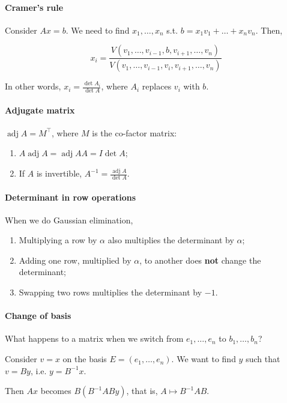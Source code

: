 \documentclass{article}
\begin{document}
\paragraph{Cramer's rule} Consider $Ax=b$. We need to find $x_1,\dots,x_n$ s.t. $b = x_1 v_1 + \dots + x_n v_n$. Then,

$$
x_i = \frac{V(v_1,\dots,v_{i-1}, b, v_{i+1}, \dots, v_n)}{V(v_1,\dots,v_{i-1}, v_i, v_{i+1}, \dots, v_n)}
$$

In other words, $x_i = \frac{\det A_i}{\det A}$, where $A_i$ replaces $v_i$ with $b$.

\paragraph{Adjugate matrix} $\operatorname{adj} A = M^\top$, where $M$ is the co-factor matrix:

\begin{enumerate}
    \item $A \operatorname{adj} A = \operatorname{adj} A A = I \det A$;
    \item If $A$ is invertible, $A^{-1} = \frac{\operatorname{adj} A}{\det A}$.
\end{enumerate}

\paragraph{Determinant in row operations} When we do Gaussian elimination,

\begin{enumerate}
    \item Multiplying a row by $\alpha$ also multiplies the determinant by $\alpha$;
    \item Adding one row, multiplied by $\alpha$, to another does \textbf{not} change the determinant;
    \item Swapping two rows multiplies the determinant by $-1$.
\end{enumerate}

\paragraph{Change of basis} What happens to a matrix when we switch from $e_1,\dots,e_n$ to $b_1,\dots, b_n$?

Consider $v = x$ on the basis $E=(e_1,\dots,e_n)$. We want to find $y$ such that $v = By$, i.e. $y = B^{-1} x$.

Then $Ax$ becomes $B(B^{-1}ABy)$, that is, $A \mapsto B^{-1} A B$.
\end{document}

